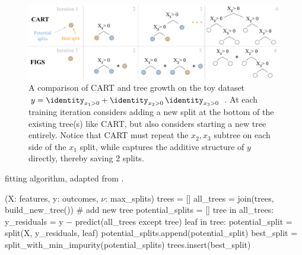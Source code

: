 \begin{figure}[H]
\centering
\includegraphics[width=\textwidth]{figures/ml/figs_intro_fig}
\caption{
A comparison of CART and \figs tree growth on the toy dataset
$y = \identity_{x_{1} > 0} + \identity_{x_{2} > 0} \, \identity_{x_{3} > 0}$ \cite{FIGS}.
At each training iteration \figs considers adding a new split at the bottom of the existing tree(s) like CART,
but also considers starting a new tree entirely.
Notice that CART must repeat the $x_{2}, x_{3}$ subtree on each side of the $x_{1}$ split,
while \figs captures the additive structure of $y$ directly, thereby saving \num{2} splits.
}
\label{fig:FIGS:intro}
\end{figure}

\begin{algorithm}[h]
  \caption{\figs fitting algorithm, adapted from \cite{FIGS}.}
  \label{algo:FIGS:fit_algo}
  \small
\begin{algorithmic}
  \State {\figs}(X: features, y: outcomes, $\nu$: max\_splits)
  \State trees = []
    \State all\_trees = join(trees, build\_new\_tree()) \textcolor{codegreen}{\# add new tree}
    \State potential\_splits = []
    \For{}\hspace{-3pt}tree in all\_trees:
        \State y\_residuals = y $-$ predict(all\_trees except tree)
        \For{}\hspace{-3pt}leaf in tree:
            \State potential\_split = split(X, y\_residuals, leaf)
            \State potential\_splits.append(potential\_split)
        \EndFor
    \EndFor
    \State best\_split = split\_with\_min\_impurity(potential\_splits)
    \State trees.insert(best\_split)
  \EndWhile
\end{algorithmic}
\end{algorithm}

